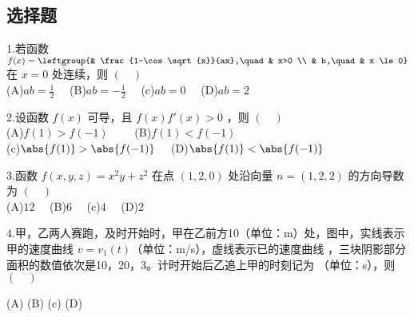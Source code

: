 
\subsection{选择题}
1.若函数 $f(x)=\leftgroup{& \frac{1-\cos \sqrt{x}}{ax},\quad  & x>0 \\ & b,\quad & x \le 0}$ 在 $x=0$ 处连续，则 $(\quad)$\\
(A)$ab=\frac{1}{2} \quad$
(B)$ab=-\frac{1}{2} \quad$
(c)$ab=0 \quad$
(D)$ab=2 \quad$

2.设函数 $f(x)$ 可导，且 $f(x)f'(x)>0$ ，则 $(\quad)$ \\
(A)$f(1)>f(-1) \qquad$
(B)$f(1)<f(-1) \quad$\\
(c)$\abs{f(1)}>\abs{f(-1)} \quad$
(D)$\abs{f(1)}<\abs{f(-1)} $

3.函数 $f(x,y,z)=x^2y+z^2$ 在点 $(1,2,0)$ 处沿向量 $n=(1,2,2)$ 的方向导数为 $(\quad)$\\
(A)$12 \quad$
(B)$6 \quad$
(c)$4 \quad$
(D)$2 \quad$


4.甲，乙两人赛跑，及时开始时，甲在乙前方10（单位：m）处，图中，实线表示甲的速度曲线 $v=v_1(t)$（单位：m/s），虚线表示已的速度曲线 ，三块阴影部分面积的数值依次是10，20，3。计时开始后乙追上甲的时刻记为 （单位：s），则 $(\quad)$


(A)
(B)
(c)
(D)